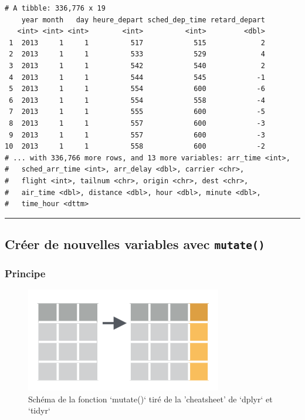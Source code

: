 \documentclass[a4paperpaper,]{article}
\begin{document}
\begin{verbatim}
# A tibble: 336,776 x 19
    year month   day heure_depart sched_dep_time retard_depart
   <int> <int> <int>        <int>          <int>         <dbl>
 1  2013     1     1          517            515             2
 2  2013     1     1          533            529             4
 3  2013     1     1          542            540             2
 4  2013     1     1          544            545            -1
 5  2013     1     1          554            600            -6
 6  2013     1     1          554            558            -4
 7  2013     1     1          555            600            -5
 8  2013     1     1          557            600            -3
 9  2013     1     1          557            600            -3
10  2013     1     1          558            600            -2
# ... with 336,766 more rows, and 13 more variables: arr_time <int>,
#   sched_arr_time <int>, arr_delay <dbl>, carrier <chr>,
#   flight <int>, tailnum <chr>, origin <chr>, dest <chr>,
#   air_time <dbl>, distance <dbl>, hour <dbl>, minute <dbl>,
#   time_hour <dttm>
\end{verbatim}

\begin{center}\rule{0.5\linewidth}{\linethickness}\end{center}

\hypertarget{creer-de-nouvelles-variables-avec-mutate}{%
\subsection{\texorpdfstring{Créer de nouvelles variables avec \texttt{mutate()}}{Créer de nouvelles variables avec mutate()}}\label{creer-de-nouvelles-variables-avec-mutate}}

\hypertarget{principe-1}{%
\subsubsection{Principe}\label{principe-1}}

\begin{figure}[htpb]

{\centering \includegraphics[width=0.5\linewidth]{images/mutate} 

}

\caption{Schéma de la fonction `mutate()` tiré de la 'cheatsheet' de `dplyr` et `tidyr`}\label{fig:mutatefig}
\end{figure}
\end{document}
